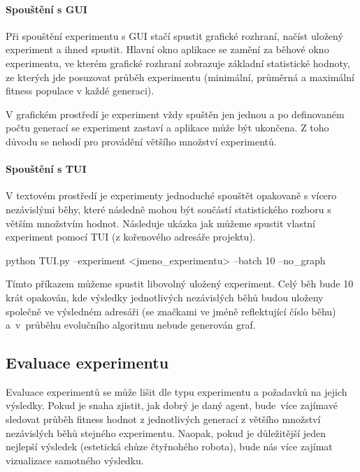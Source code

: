 \paragraph{Spouštění s GUI}
Při spouštění experimentu s GUI stačí spustit grafické rozhraní, načíst uložený
experiment a ihned spustit. Hlavní okno aplikace se zamění za běhové okno
experimentu, ve kterém grafické rozhraní zobrazuje základní statistické
hodnoty, ze kterých jde posuzovat průběh experimentu (minimální, průměrná a
maximální fitness populace v každé generaci). 

V grafickém prostředí je experiment vždy spuštěn jen jednou a po definovaném
počtu generací se experiment zastaví a aplikace může být ukončena. Z toho
důvodu se nehodí pro provádění většího množství experimentů.

\paragraph{Spouštění s TUI}
V textovém prostředí je experimenty jednoduché spouštět opakovaně s vícero
nezávislými běhy, které následně mohou být součástí statistického rozboru s
větším množstvím hodnot. Následuje ukázka jak můžeme spustit vlastní
experiment pomocí TUI (z kořenového adresáře projektu).
\begin{code}
python TUI.py --experiment <jmeno_experimentu> --batch 10 --no_graph
\end{code}
Tímto příkazem můžeme spustit libovolný uložený experiment. Celý běh bude 10
krát opakován, kde výsledky jednotlivých nezávislých běhů budou uloženy
společně ve výsledném adresáři (se značkami ve jméně reflektující číslo běhu)
a~v~průběhu evolučního algoritmu nebude generován graf.

\subsection{Evaluace experimentu} \label{doc_23_seasoning}
Evaluace experimentů se může lišit dle typu experimentu a požadavků na jejich
výsledky. Pokud je snaha zjistit, jak dobrý je daný agent, bude~více zajímavé
sledovat průběh fitness hodnot z jednotlivých generací z většího množství
nezávislých běhů stejného experimentu. Naopak, pokud je důležitější jeden
nejlepší výsledek (estetická chůze čtyřnohého robota), bude nás více zajímat
vizualizace samotného výsledku.

